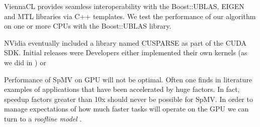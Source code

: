 \documentclass{report}
\begin{document}
ViennaCL provides seamless interoperability with the Boost::UBLAS, EIGEN and MTL libraries via C++ templates. We test the performance of our algorithm on one or more CPUs with the Boost::UBLAS library. 

NVidia eventually included a library named CUSPARSE as part of the CUDA SDK. Initial releases were 
Developers either implemented their own kernels (as we did in \cite{BolligFlyerErlebacher2012}) or   



Performance of SpMV on GPU will not be optimal. Often one finds in literature examples of applications that have been accelerated by huge factors. In fact, speedup factors greater than 10x should never be possible for SpMV. In order to manage expectations of how much faster tasks will operate on the GPU we can turn to a \emph{roofline model} \cite{Williams2009}.







\end{document}
